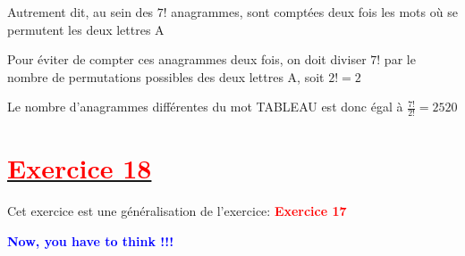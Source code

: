\documentclass[12pt]{article}
\begin{document}
Autrement dit, au sein des $7 !$ anagrammes, sont comptées deux fois les mots où se permutent les deux lettres A

Pour éviter de compter ces anagrammes deux fois, on doit diviser $7 !$ par le nombre de permutations possibles des deux
lettres A, soit $2 !=2$

Le nombre d’anagrammes différentes du mot TABLEAU est donc égal à $\frac{7!}{2!}=2520$
\section*{\underline{\textbf{\textcolor{red}{Exercice 18}}}}
Cet exercice est une généralisation de l'exercice: \textbf{\textcolor{red}{Exercice 17}}

\textbf{\textcolor{blue}{Now, you have to think !!!}}
\end{document}
